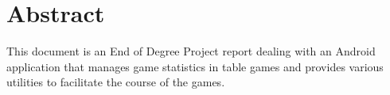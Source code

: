 \chapter*{Abstract}

This document is an End of Degree Project report dealing with an Android application that manages game statistics in table games and provides various utilities to facilitate the course of the games.
